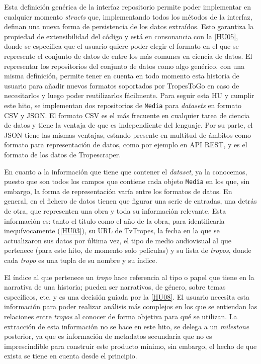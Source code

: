 Esta definición genérica de la interfaz repositorio permite poder implementar en
cualquier momento \textit{structs} que, implementando todos los métodos de la
interfaz, definan una nueva forma de persistencia de los datos extraídos. Esto
garantiza la propiedad de extensibilidad del código y está en consonancia con la
\href{https://github.com/jlgallego99/TropesToGo/issues/30}{[HU05]}, donde se
especifica que el usuario quiere poder elegir el formato en el que se represente
el conjunto de datos de entre los más comunes en ciencia de datos. El
representar los repositorios del conjunto de datos como algo genérico, con una
misma definición, permite tener en cuenta en todo momento esta historia de
usuario para añadir nuevos formatos soportados por TropesToGo en caso de
necesitarlos y luego poder reutilizarlos fácilmente. Para seguir esta HU y
cumplir este hito, se implementan dos repositorios de \texttt{Media} para
\textit{datasets} en formato CSV y JSON. El formato CSV es el más frecuente en
cualquier tarea de ciencia de datos y tiene la ventaja de que es independiente
del lenguaje. Por su parte, el JSON tiene las mismas ventajas, estando presente
en multitud de ámbitos como formato para representación de datos, como por
ejemplo en API REST, y es el formato de los datos de Tropescraper.

En cuanto a la información que tiene que contener el \textit{dataset}, ya la
conocemos, puesto que son todos los campos que contiene cada objeto \texttt{Media} 
en los que, sin embargo, la forma de representación varía entre
los formatos de datos. En general, en el fichero de datos tienen que figurar una
serie de entradas, una detrás de otra, que representen una obra y toda su
información relevante. Esta información es: tanto el título como el año de la
obra, para identificarla inequívocamente
(\href{https://github.com/jlgallego99/TropesToGo/issues/8}{[HU03]}), su URL de
TvTropes, la fecha en la que se actualizaron sus datos por última vez, el tipo
de medio audiovisual al que pertenece (para este hito, de momento solo
películas) y su lista de \textit{tropos}, donde cada \textit{tropo} es una tupla
de su nombre y su índice. 

El índice al que pertenece un \textit{tropo} hace referencia al tipo o
papel que tiene en la narrativa de una historia; pueden ser narrativos, de
género, sobre temas específicos, etc. y es una decisión guiada por la
\href{https://github.com/jlgallego99/TropesToGo/issues/57}{[HU08]}. El usuario
necesita esta información para poder realizar análisis más complejos en los que
se entiendan las relaciones entre \textit{tropos} al conocer de forma objetiva
para qué se utilizan. La extracción de esta información no se hace en este
hito, se delega a un \textit{milestone} posterior, ya que es información de
metadatos secundaria que no es imprescindible para construir este producto
mínimo, sin embargo, el hecho de que exista se tiene en cuenta desde el
principio.

